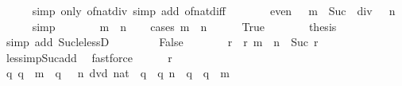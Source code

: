 \begin{isabellebody}
\ \ \ \ \isamarkupfalse%
\ {\isacharparenleft}{\kern0pt}simp\ only{\isacharcolon}{\kern0pt}\ of{\isacharunderscore}{\kern0pt}nat{\isacharunderscore}{\kern0pt}div{\isacharparenright}{\kern0pt}\ {\isacharparenleft}{\kern0pt}simp\ add{\isacharcolon}{\kern0pt}\ of{\isacharunderscore}{\kern0pt}nat{\isacharunderscore}{\kern0pt}diff{\isacharparenright}{\kern0pt}\isanewline
\ \ \isamarkupfalse%
\ \isamarkupfalse%
\ {\isacartoucheopen}{\isasymdots}\ {\isasymlongleftrightarrow}\ even\ {\isacharparenleft}{\kern0pt}{\isacharparenleft}{\kern0pt}{}\ {\isacharcircum}{\kern0pt}\ m\ {\isacharminus}{\kern0pt}\ Suc\ {}{\isacharparenright}{\kern0pt}\ div\ {}\ {\isacharcircum}{\kern0pt}\ n{\isacharparenright}{\kern0pt}{\isacartoucheclose}\isanewline
\ \ \ \ \isamarkupfalse%
\ simp\isanewline
\ \ \isamarkupfalse%
\ \isamarkupfalse%
\ {\isacartoucheopen}{\isasymdots}\ {\isasymlongleftrightarrow}\ m\ {\isasymle}\ n{\isacartoucheclose}\isanewline
\ \ \isamarkupfalse%
\ {\isacharparenleft}{\kern0pt}cases\ {\isacartoucheopen}m\ {\isasymle}\ n{\isacartoucheclose}{\isacharparenright}{\kern0pt}\isanewline
\ \ \ \ \isamarkupfalse%
\ True\isanewline
\ \ \ \ \isamarkupfalse%
\ \isamarkupfalse%
\ {\isacharquery}{\kern0pt}thesis\isanewline
\ \ \ \ \ \ \isamarkupfalse%
\ {\isacharparenleft}{\kern0pt}simp\ add{\isacharcolon}{\kern0pt}\ Suc{\isacharunderscore}{\kern0pt}le{\isacharunderscore}{\kern0pt}lessD{\isacharparenright}{\kern0pt}\isanewline
\ \ \isamarkupfalse%
\isanewline
\ \ \ \ \isamarkupfalse%
\ False\isanewline
\ \ \ \ \isamarkupfalse%
\ \isamarkupfalse%
\ r\ \ r{\isacharcolon}{\kern0pt}\ {\isacartoucheopen}m\ {\isacharequal}{\kern0pt}\ n\ {\isacharplus}{\kern0pt}\ Suc\ r{\isacartoucheclose}\isanewline
\ \ \ \ \ \ \isamarkupfalse%
\ less{\isacharunderscore}{\kern0pt}imp{\isacharunderscore}{\kern0pt}Suc{\isacharunderscore}{\kern0pt}add\ \isamarkupfalse%
\ fastforce\isanewline
\ \ \ \ \isamarkupfalse%
\ r\ \isamarkupfalse%
\ {\isacartoucheopen}{\isacharbraceleft}{\kern0pt}q{\isachardot}{\kern0pt}\ q\ {\isacharless}{\kern0pt}\ m{\isacharbraceright}{\kern0pt}\ {\isasyminter}\ {\isacharbraceleft}{\kern0pt}q{\isachardot}{\kern0pt}\ {}\ {\isacharcircum}{\kern0pt}\ n\ dvd\ {\isacharparenleft}{\kern0pt}{}{\isacharcolon}{\kern0pt}{\isacharcolon}{\kern0pt}nat{\isacharparenright}{\kern0pt}\ {\isacharcircum}{\kern0pt}\ q{\isacharbraceright}{\kern0pt}\ {\isacharequal}{\kern0pt}\ {\isacharbraceleft}{\kern0pt}q{\isachardot}{\kern0pt}\ n\ {\isasymle}\ q\ {\isasymand}\ q\ {\isacharless}{\kern0pt}\ m{\isacharbraceright}{\kern0pt}{\isacartoucheclose}\isanewline

\end{isabellebody}
